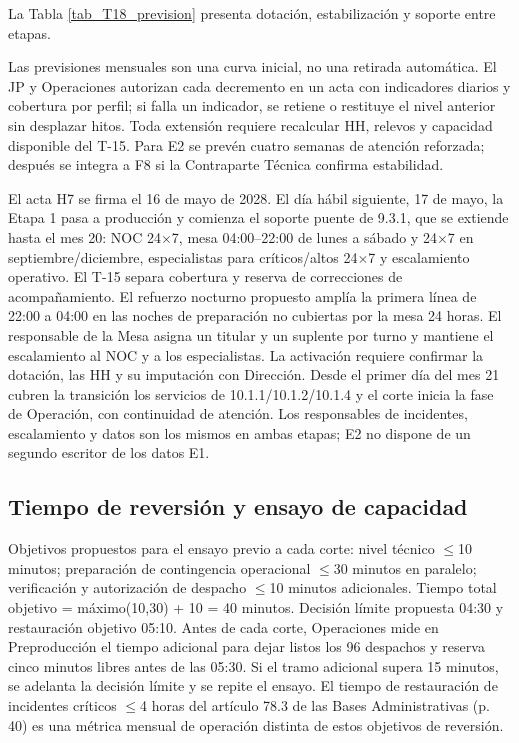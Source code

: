 La Tabla \ref{tab_T18_prevision} presenta dotación, estabilización y soporte entre etapas.


Las previsiones mensuales son una curva inicial, no una retirada automática. El JP y Operaciones autorizan cada decremento en un acta con indicadores diarios y cobertura por perfil; si falla un indicador, se retiene o restituye el nivel anterior sin desplazar hitos. Toda extensión requiere recalcular HH, relevos y capacidad disponible del T-15. Para E2 se prevén cuatro semanas de atención reforzada; después se integra a F8 si la Contraparte Técnica confirma estabilidad.

El acta H7 se firma el 16 de mayo de 2028. El día hábil siguiente, 17 de mayo, la Etapa 1 pasa a producción y comienza el soporte puente de 9.3.1, que se extiende hasta el mes 20: NOC 24\ensuremath{\times}7, mesa 04:00–22:00 de lunes a sábado y 24\ensuremath{\times}7 en septiembre/diciembre, especialistas para críticos/altos 24\ensuremath{\times}7 y escalamiento operativo. El T-15 separa cobertura y reserva de correcciones de acompañamiento. El refuerzo nocturno propuesto amplía la primera línea de 22:00 a 04:00 en las noches de preparación no cubiertas por la mesa 24 horas. El responsable de la Mesa asigna un titular y un suplente por turno y mantiene el escalamiento al NOC y a los especialistas. La activación requiere confirmar la dotación, las HH y su imputación con Dirección. Desde el primer día del mes 21 cubren la transición los servicios de 10.1.1/\allowbreak{}10.1.2/\allowbreak{}10.1.4 y el corte inicia la fase de Operación, con continuidad de atención. Los responsables de incidentes, escalamiento y datos son los mismos en ambas etapas; E2 no dispone de un segundo escritor de los datos E1.

\subsection{Tiempo de reversión y ensayo de capacidad}

Objetivos propuestos para el ensayo previo a cada corte: nivel técnico \ensuremath{\leq}10 minutos; preparación de contingencia operacional \ensuremath{\leq}30 minutos en paralelo; verificación y autorización de despacho \ensuremath{\leq}10 minutos adicionales. Tiempo total objetivo = máximo(10,30) + 10 = 40 minutos. Decisión límite propuesta 04:30 y restauración objetivo 05:10. Antes de cada corte, Operaciones mide en Preproducción el tiempo adicional para dejar listos los 96 despachos y reserva cinco minutos libres antes de las 05:30. Si el tramo adicional supera 15 minutos, se adelanta la decisión límite y se repite el ensayo. El tiempo de restauración de incidentes críticos \ensuremath{\leq}4 horas del artículo 78.3 de las Bases Administrativas (p. 40) es una métrica mensual de operación distinta de estos objetivos de reversión.

